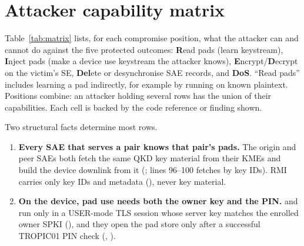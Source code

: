 \documentclass[11pt,a4paper]{article}
\begin{document}
\section{Attacker capability matrix}\label{sec:matrix}
Table~\ref{tab:matrix} lists, for each compromise position, what the attacker can and cannot do against the five protected outcomes: \textbf{R}ead pads (learn keystream), \textbf{I}nject pads (make a device use keystream the attacker knows), \textbf{E}ncrypt/\textbf{D}ecrypt on the victim's SE, \textbf{Del}ete or desynchronise SAE records, and \textbf{DoS}. ``Read pads'' includes learning a pad indirectly, for example by running  on known plaintext. Positions combine: an attacker holding several rows has the union of their capabilities. Each cell is backed by the code reference or finding shown.

Two structural facts determine most rows.
\begin{enumerate}
\item \textbf{Every SAE that serves a pair knows that pair's pads.} The origin and peer SAEs both fetch the same QKD key material from their KMEs and build the device downlink from it (;  lines 96--100 fetches by key IDs). RMI carries only key IDs and metadata (), never key material.
\item \textbf{On the device, pad use needs both the owner key and the PIN.}  and  run only in a USER-mode TLS session whose server key matches the enrolled owner SPKI (), and they open the pad store only after a successful TROPIC01 PIN check (, ).
\end{enumerate}
\end{document}
